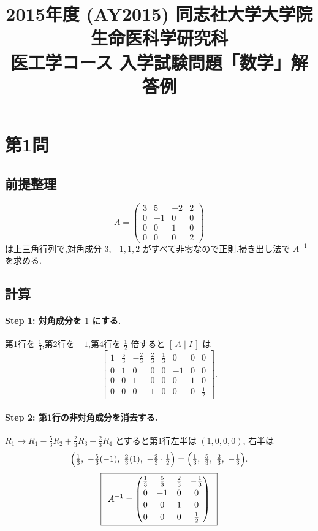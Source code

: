 \documentclass[11pt,a4paper]{article}
\title{2015年度 (AY2015) 同志社大学大学院 生命医科学研究科\\
医工学コース 入学試験問題「数学」解答例}
\author{}
\date{}
\begin{document}
\maketitle
\vspace{-3em}

\section*{第1問}

\subsection*{前提整理}

\[
A=\begin{pmatrix}3&5&-2&2\\0&-1&0&0\\0&0&1&0\\0&0&0&2\end{pmatrix}
\]
は上三角行列で,対角成分 $3,-1,1,2$ がすべて非零なので正則.掃き出し法で
$A^{-1}$ を求める.

\subsection*{計算}

\paragraph{Step 1: 対角成分を $1$ にする.}
第1行を $\tfrac13$,第2行を $-1$,第4行を $\tfrac12$ 倍すると
$[\,A\mid I\,]$ は
\[
\left[\begin{array}{cccc|cccc}
1&\frac53&-\frac23&\frac23&\frac13&0&0&0\\
0&1&0&0&0&-1&0&0\\
0&0&1&0&0&0&1&0\\
0&0&0&1&0&0&0&\frac12
\end{array}\right].
\]

\paragraph{Step 2: 第1行の非対角成分を消去する.}
$R_1\to R_1-\tfrac53R_2+\tfrac23R_3-\tfrac23R_4$ とすると第1行左半は $(1,0,0,0)$,
右半は
\[
\Bigl(\tfrac13,\ -\tfrac53(-1),\ \tfrac23(1),\ -\tfrac23\cdot\tfrac12\Bigr)
=\Bigl(\tfrac13,\ \tfrac53,\ \tfrac23,\ -\tfrac13\Bigr).
\]
\[
\boxed{\,\
A^{-1}=\begin{pmatrix}
\frac13&\frac53&\frac23&-\frac13\\[2pt]
0&-1&0&0\\[2pt]
0&0&1&0\\[2pt]
0&0&0&\frac12
\end{pmatrix}\ \,}
\]
\end{document}
